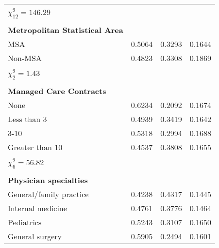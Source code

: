 \documentclass[12pt]{report}
\begin{document}
{\begin{center}
\begin{longtable}{lccc}
                                       &          &            &            \\
$\chi^2_{12} = 146.29$                 &          &            &            \\
                                       &          &            &            \\
\textbf{Metropolitan Statistical Area} &          &            &            \\
MSA                                    & 0.5064   & 0.3293     & 0.1644     \\
Non-MSA                                & 0.4823   & 0.3308     & 0.1869     \\
                                       &          &            &            \\
$\chi^2_2 = 1.43$                      &          &            &            \\
                                       &          &            &            \\
\textbf{Managed Care Contracts}        &          &            &            \\
None                                   & 0.6234   & 0.2092     & 0.1674     \\
Less than 3                            & 0.4939   & 0.3419     & 0.1642     \\
3-10                                   & 0.5318   & 0.2994     & 0.1688     \\
Greater than 10                        & 0.4537   & 0.3808     & 0.1655     \\
                                       &          &            &            \\
$\chi^2_6 = 56.82$                     &          &            &            \\
                                       &          &            &            \\
\textbf{Physician specialties}         &          &            &            \\
General/family practice                & 0.4238   & 0.4317     & 0.1445     \\
Internal medicine                      & 0.4761   & 0.3776     & 0.1464     \\
Pediatrics                             & 0.5243   & 0.3107     & 0.1650     \\
General surgery                        & 0.5905   & 0.2494     & 0.1601     \\

\end{longtable}
\end{center}}
\end{document}
